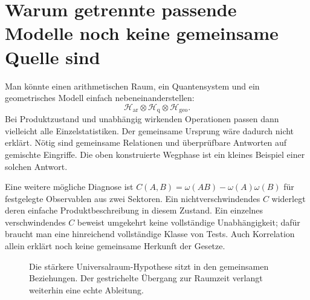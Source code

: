 \section{Warum getrennte passende Modelle noch keine gemeinsame Quelle sind}
Man könnte einen arithmetischen Raum, ein Quantensystem und ein geometrisches Modell einfach nebeneinanderstellen:
\[
 \mathcal H_{\mathrm{ar}}\otimes\mathcal H_{\mathrm{q}}\otimes\mathcal H_{\mathrm{geo}}.
\]
Bei Produktzustand und unabhängig wirkenden Operationen passen dann vielleicht alle Einzelstatistiken. Der gemeinsame Ursprung wäre dadurch nicht erklärt. Nötig sind gemeinsame Relationen und überprüfbare Antworten auf gemischte Eingriffe. Die oben konstruierte Wegphase ist ein kleines Beispiel einer solchen Antwort.

Eine weitere mögliche Diagnose ist $C(A,B)=\omega(AB)-\omega(A)\omega(B)$ für festgelegte Observablen aus zwei Sektoren. Ein nichtverschwindendes $C$ widerlegt deren einfache Produktbeschreibung in diesem Zustand. Ein einzelnes verschwindendes $C$ beweist umgekehrt keine vollständige Unabhängigkeit; dafür braucht man eine hinreichend vollständige Klasse von Tests. Auch Korrelation allein erklärt noch keine gemeinsame Herkunft der Gesetze.

\begin{figure}[H]\centering
{}
\caption{Die stärkere Universalraum-Hypothese sitzt in den gemeinsamen Beziehungen. Der gestrichelte Übergang zur Raumzeit verlangt weiterhin eine echte Ableitung.}
\end{figure}

\Needspace{140pt}
